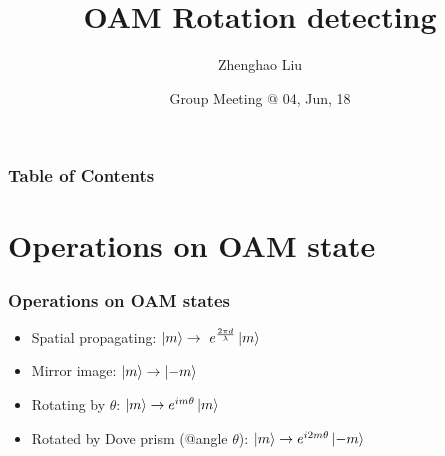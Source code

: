 \documentclass[amssymb, amsmath]{beamer}
\title[Group talk] %
{OAM Rotation detecting}
\subtitle{}
\author[Zhenghao Liu] %
{Zhenghao Liu\inst{1} \inst{2}}
\institute[] %
{
  \inst{1}%
  Key Laboratory of Quantum Informaion, CAS
  \and
  \inst{2}%
  University of Science and Technology of China
}
\date[\today] %
{Group Meeting $@$ 04, Jun, 18}
\begin{document}
\frame{\titlepage}


\begin{frame}
\frametitle{Table of Contents}
\tableofcontents
\end{frame}


\section{Operations on OAM state}

\begin{frame}
\frametitle{Operations on OAM states}

\begin{itemize}
    \item Spatial propagating: $\ket{m}\to\ e^{\frac{2\pi d}{\lambda}}\ket{m}$
    \item Mirror image: $\ket{m}\to\ket{-m}$
    \item Rotating by $\theta$: $\ket{m}\to e^{im\theta}\ket{m}$
    \item Rotated by \textcolor{suoh}{Dove prism} (@angle $\theta$): $\ket{m}\to e^{i2m\theta}\ket{-m}$
\end{itemize}
\end{frame}
\end{document}
